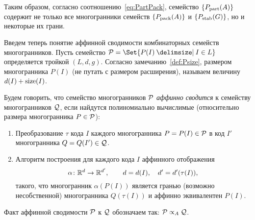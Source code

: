 Таким образом, согласно соотношению~\eqref{eq:PartPack}, семейство $\{P_{\textup{part}}(A)\}$ содержит не только все многогранники семейств $\{P_{\textup{pack}}(A)\}$ и $\{P_{\textup{stab}}(G)\}$, но и некоторые их грани.

Введем теперь понятие аффинной сводимости
комбинаторных семейств многогранников.
Пусть семейство $\Pf = \Set{P(I)\given I\in L}$ определяется тройкой $(L, d, g)$.
Согласно замечанию~\ref{def:Psize}, размером многогранника $P(I)$ (не путать с размером расширения), называем величину $d(I) + \operatorname{size}(I)$.




\begin{definition}
	\label{def:Aff}
	Будем говорить, что семейство многогранников ${\mathcal P}$ \emph{аффинно сводится} к семейству многогранников ${\mathcal Q}$, если найдутся полиномиально вычислимые (относительно размера многогранника $P\in {\mathcal P}$):
	\begin{enumerate}
		\item 
		Преобразование $\tau$ кода $I$ каждого многогранника $P = P(I)\in {\mathcal P}$ в код $I'$ многогранника $Q = Q(I') \in {\mathcal Q}$.
		\item 
		Алгоритм построения для каждого кода $I$ аффинного отображения
		\[
		\alpha\colon \mathbb{R}^d \to \mathbb{R}^{d'}, \qquad d = d(I), \quad d' = d'(\tau(I)),
		\]
		такого, что многогранник $\alpha(P(I))$ является гранью (возможно несобственной) многогранника $Q(\tau(I))$ и аффинно эквивалентен $P(I)$.
	\end{enumerate}
	Факт аффинной сводимости ${\mathcal P}$ к ${\mathcal Q}$ обозначаем так: ${\mathcal P} \propto_A {\mathcal Q}$.  
\end{definition}

